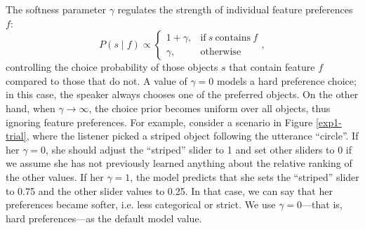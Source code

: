 \documentclass[10pt,a4paper]{article}
\begin{document}
The softness parameter $\gamma$ regulates the strength of individual feature preferences $f$:
\begin{equation}
P(s \mid f) \propto \begin{cases}
1 + \gamma, & \text{if}\ s\ \text{contains}\ f \\
\gamma, & \text{otherwise}
\end{cases},
\end{equation}
controlling the choice probability of those objects $s$ that contain feature $f$ compared to those that do not.  
A value of $\gamma=0$ models a hard preference choice; in this case, the speaker always chooses one of the preferred objects. 
On the other hand, when $\gamma \rightarrow \infty$, the choice prior becomes uniform over all objects, thus ignoring feature preferences. 
For example, consider a scenario in Figure \ref{exp1-trial}, where the listener picked a striped object following the utterance ``circle''. If her $\gamma=0$, she should adjust the ``striped'' slider to 1 and set other sliders to 0 if we assume she has not previously learned anything about the relative ranking of the other values. If her $\gamma=1$, the model predicts that she sets the ``striped'' slider to 0.75 and the other slider values to 0.25. In that case, we can say that her preferences became softer, i.e. less categorical or strict.
% 
We use $\gamma=0$---that is, hard preferences---as the default model value.
\end{document}
